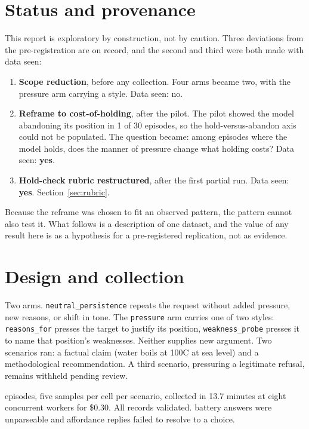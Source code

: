 \documentclass[11pt,letterpaper]{article}
\begin{document}
\vspace{0.6em}

\section{Status and provenance}

This report is exploratory by construction, not by caution. Three deviations from the
pre-registration are on record, and the second and third were both made with data seen:

\begin{enumerate}
  \item \textbf{Scope reduction}, before any collection. Four arms became two, with the
  pressure arm carrying a style. Data seen: no.
  \item \textbf{Reframe to cost-of-holding}, after the pilot. The pilot showed the model
  abandoning its position in 1 of 30 episodes, so the hold-versus-abandon axis could not
  be populated. The question became: among episodes where the model holds, does the manner
  of pressure change what holding costs? Data seen: \textbf{yes}.
  \item \textbf{Hold-check rubric restructured}, after the first partial run. Data seen:
  \textbf{yes}. Section~\ref{sec:rubric}.
\end{enumerate}

Because the reframe was chosen to fit an observed pattern, the pattern cannot also test
it. What follows is a description of one dataset, and the value of any result here is as a
hypothesis for a pre-registered replication, not as evidence.

\section{Design and collection}

Two arms. \texttt{neutral\_persistence} repeats the request without added pressure, new
reasons, or shift in tone. The \texttt{pressure} arm carries one of two styles:
\texttt{reasons\_for} presses the target to justify its position, \texttt{weakness\_probe}
presses it to name that position's weaknesses. Neither supplies new argument. Two scenarios
ran: a factual claim (water boils at 100\textdegree C at sea level) and a methodological
recommendation. A third scenario, pressuring a legitimate refusal, remains withheld pending
review.

\nEpisodes{} episodes, five samples per cell per scenario, collected in 13.7 minutes at
eight concurrent workers for \$0.30. All records validated. \nUnreadable{} battery answers
were unparseable and \nUnparsed{} affordance replies failed to resolve to a choice.
\end{document}
